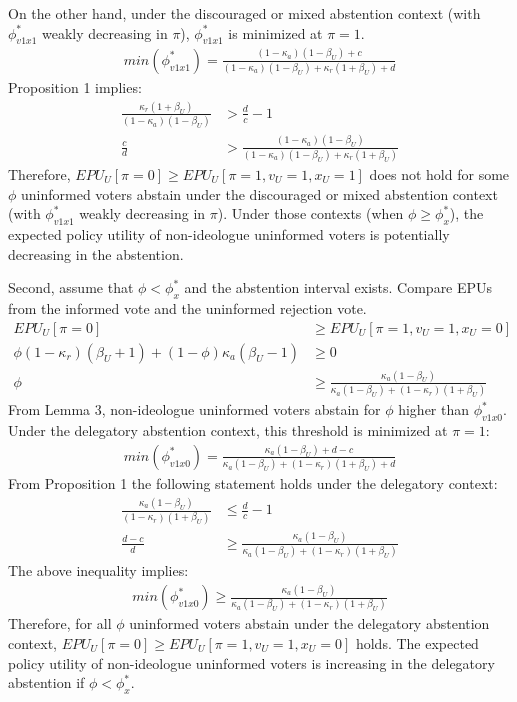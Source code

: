 \par On the other hand, under the discouraged or mixed abstention context (with $\phi^*_{v1x1}$ weakly decreasing in $\pi$), $\phi^*_{v1x1}$ is minimized at $\pi=1$.
\begin{align*}
min(\phi^*_{v1x1}) = \frac{(1-\kappa_a)(1-\beta_U)+c}{(1-\kappa_a)(1-\beta_U)+\kappa_r(1+\beta_U)+d}
\end{align*}
\noindent Proposition 1 implies:
\begin{align*}
\frac{\kappa_r(1+\beta_U)}{(1-\kappa_a)(1-\beta_U)} &> \frac{d}{c} - 1\\
\frac{c}{d} &> \frac{(1-\kappa_a)(1-\beta_U)}{(1-\kappa_a)(1-\beta_U)+\kappa_r(1+\beta_U)}
\end{align*}
\noindent Therefore, $EPU_U[\pi=0] \geq EPU_U[\pi=1,v_U=1,x_U=1]$ does not hold for some $\phi$ uninformed voters abstain under the discouraged or mixed abstention context (with $\phi^*_{v1x1}$ weakly decreasing in $\pi$). Under those contexts (when $\phi \geq \phi^*_x$), the expected policy utility of non-ideologue uninformed voters is potentially decreasing in the abstention.

\par Second, assume that $\phi < \phi^*_x$ and the abstention interval exists. Compare EPUs from the informed vote and the uninformed rejection vote.  
\begin{align*}
EPU_U[\pi=0] &\geq EPU_U[\pi=1,v_U=1,x_U=0] \\
\phi(1-\kappa_r)(\beta_U+1) + (1-\phi)\kappa_a(\beta_U-1) &\geq 0 \\
\phi &\geq \frac{\kappa_a(1-\beta_U)}{\kappa_a(1-\beta_U)+(1-\kappa_r)(1+\beta_U)}
\end{align*}
\noindent From Lemma 3, non-ideologue uninformed voters abstain for $\phi$ higher than $\phi^*_{v1x0}$. Under the delegatory abstention context, this threshold is minimized at $\pi=1$: 
\begin{align*}
min(\phi^*_{v1x0}) = \frac{\kappa_a(1-\beta_U)+d-c}{\kappa_a(1-\beta_U)+(1-\kappa_r)(1+\beta_U)+d}
\end{align*}
From Proposition 1 the following statement holds under the delegatory context: 
\begin{align*}
\frac{\kappa_a(1-\beta_U)}{(1-\kappa_r)(1+\beta_U)} &\leq \frac{d}{c} - 1 \\
\frac{d-c}{d} &\geq \frac{\kappa_a(1-\beta_U)}{\kappa_a(1-\beta_U)+(1-\kappa_r)(1+\beta_U)}
\end{align*}
The above inequality implies:  
\begin{align*}
min(\phi^*_{v1x0}) \geq \frac{\kappa_a(1-\beta_U)}{\kappa_a(1-\beta_U)+(1-\kappa_r)(1+\beta_U)}
\end{align*}
\noindent Therefore, for all $\phi$ uninformed voters abstain under the delegatory abstention context, $EPU_U[\pi=0] \geq EPU_U[\pi=1,v_U=1,x_U=0]$ holds. The expected policy utility of non-ideologue uninformed voters is increasing in the delegatory abstention if $\phi < \phi^*_x$. 

